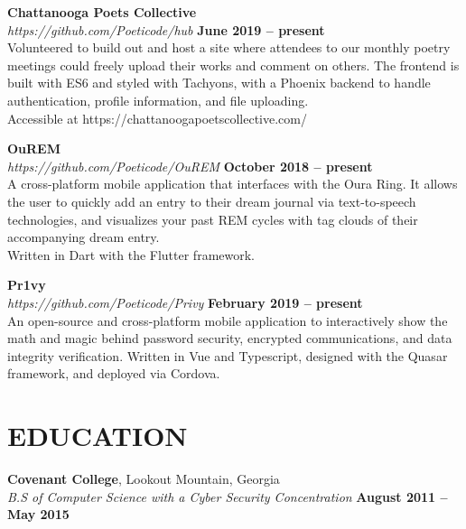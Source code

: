 \documentclass[margin,line]{resume}
\begin{document}
\begin{resume}
    \textbf{\listing Chattanooga Poets Collective}\\
    \textsl{https://github.com/Poeticode/hub} \hfill \textbf{June 2019 -- present}\\
    Volunteered to build out and host a site where attendees to our monthly poetry meetings could freely upload their works and comment on others. The frontend is built with ES6 and styled with Tachyons, with a Phoenix backend to handle authentication, profile information, and file uploading. \\
    Accessible at https://chattanoogapoetscollective.com/

    \textbf{\listing OuREM}\\
    \textsl{https://github.com/Poeticode/OuREM} \hfill \textbf{October 2018 -- present}\\
    A cross-platform mobile application that interfaces with the Oura Ring. It allows the user to quickly add an entry to their dream journal via text-to-speech technologies, and visualizes your past REM cycles with tag clouds of their accompanying dream entry.\\
    Written in Dart with the Flutter framework.

    \textbf{\listing Pr1vy}\\
    \textsl{https://github.com/Poeticode/Privy} \hfill \textbf{February 2019 -- present}\\
    An open-source and cross-platform mobile application to interactively show the math and magic behind password security, encrypted communications, and data integrity verification. Written in Vue and Typescript, designed with the Quasar framework, and deployed via Cordova.

    \vspace{-1mm}

\sectionline


    \section{\mysidestyle \textbf{\large{E}\small{DUCATION}}}

    \textbf{\listing Covenant College}, Lookout Mountain, Georgia \vspace{1mm}\\
    \textsl{B.S of Computer Science with a Cyber Security Concentration} \hfill \textbf{August 2011 -- May 2015}\vspace{-3mm}\\\vspace{-1mm}%


\end{resume}
\end{document}
